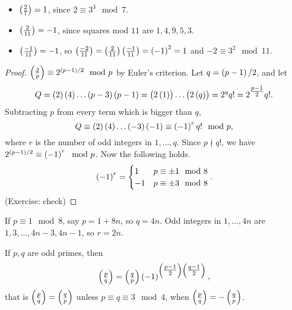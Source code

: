 \pagebreak

\begin{example*}
\hfill
\begin{itemize}
\item $ \jacobi{2}{7} = 1 $, since $ 2 \equiv 3^3 \mod 7 $.
\item $ \jacobi{2}{11} = -1 $, since squares mod $ 11 $ are $ 1, 4, 9, 5, 3 $.
\item $ \jacobi{-1}{11} = -1 $, so $ \jacobi{-2}{11} = \jacobi{2}{11}\jacobi{-1}{11} = \br{-1}^2 = 1 $ and $ -2 \equiv 3^2 \mod 11 $.
\end{itemize}
\end{example*}

\begin{proof}
$ \jacobi{2}{p} \equiv 2^{\br{p - 1} / 2} \mod p $ by Euler's criterion. Let $ q = \br{p - 1} / 2 $, and let
$$ Q = \br{2}\br{4} \dots \br{p - 3}\br{p - 1} = \br{2\br{1}} \dots \br{2\br{q}} = 2^qq! = 2^{\tfrac{p - 1}{2}}q!. $$
Subtracting $ p $ from every term which is bigger than $ q $,
$$ Q \equiv \br{2}\br{4} \dots \br{-3}\br{-1} \equiv \br{-1}^rq! \mod p, $$
where $ r $ is the number of odd integers in $ 1, \dots, q $. Since $ p \nmid q! $, we have $ 2^{\br{p - 1} / 2} \equiv \br{-1}^r \mod p $. Now the following holds.
$$ \br{-1}^r =
\begin{cases}
1 & p \equiv \pm 1 \mod 8 \\
-1 & p \equiv \pm 3 \mod 8
\end{cases}.
$$
(Exercise: check)
\end{proof}

\begin{example*}
If $ p \equiv 1 \mod 8 $, say $ p = 1 + 8n $, so $ q = 4n $. Odd integers in $ 1, \dots, 4n $ are $ 1, 3, \dots, 4n - 3, 4n - 1 $, so $ r = 2n $.
\end{example*}

\begin{theorem}
\label{thm:40}
If $ p, q $ are odd primes, then
$$ \jacobi{p}{q} = \jacobi{q}{p}\br{-1}^{\br{\tfrac{p - 1}{2}}\br{\tfrac{q - 1}{2}}}, $$
that is $ \jacobi{p}{q} = \jacobi{q}{p} $ unless $ p \equiv q \equiv 3 \mod 4 $, when $ \jacobi{p}{q} = -\jacobi{q}{p} $.
\end{theorem}

